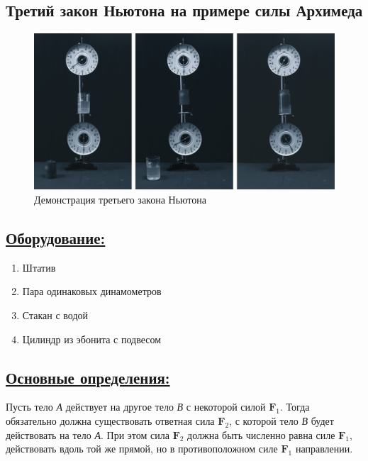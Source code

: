 \documentclass[14pt,a4paper,oneside]{extarticle}	%
\begin{document}

\newpage
\begin{center}
	\subsection*{Третий закон Ньютона на примере силы Архимеда}
\end{center}

\begin{figure}[H]
	\centering 		
	\includegraphics[width=1\linewidth]{newton-3.png} 
	\caption{Демонстрация третьего закона Ньютона}
	\label{newton-3}
\end{figure}

\subsection*{\underline{Оборудование:}}

\begin{enumerate}
	\item Штатив
	\item Пара одинаковых динамометров
	\item Стакан с водой
	\item Цилиндр из эбонита с подвесом
\end{enumerate}

\newpage
\subsection*{\underline{Основные определения:}}

Пусть тело \textit{А} действует на другое тело \textit{В} с некоторой силой $\textbf{F}_1$. 
Тогда обязательно должна существовать ответная сила $\textbf{F}_2$, с которой 
тело \textit{В} будет действовать на тело \textit{А}.
При этом сила $\textbf{F}_2$ должна быть численно равна силе $\textbf{F}_1$, действовать вдоль той же прямой, но в противоположном силе $\textbf{F}_1$ направлении. 
\end{document}

